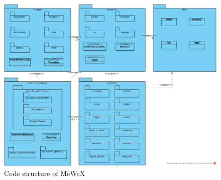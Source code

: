 \begin{figure}[ht]
	\centering
	\includegraphics[scale=0.14]{img/mewex_structure.png}
	\caption{Code structure of MeWeX}
	\label{img_structure}
\end{figure}

